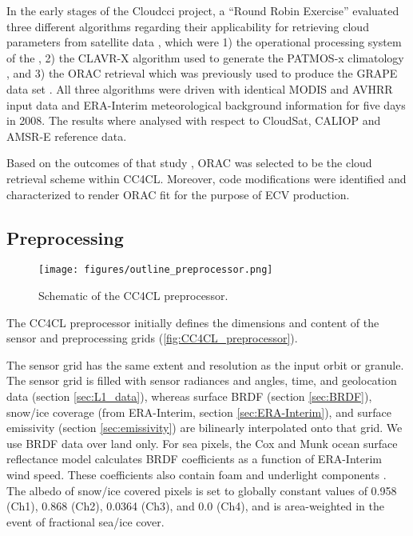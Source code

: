 In the early stages of the Cloud\textunderscore cci project, a ``Round Robin Exercise'' evaluated three different algorithms regarding their applicability for retrieving cloud parameters from satellite data \citep{Stengel15}, which were 1) the operational processing system of the \citet{CMSAF_web}, 2) the CLAVR-X algorithm used to generate the PATMOS-x climatology \citep{Heidinger13}, and 3) the ORAC retrieval which was previously used to produce the GRAPE data set \citep{Thomas09_GRAPE, GRAPE_web}. All three algorithms were driven with identical MODIS and AVHRR input data and ERA-Interim meteorological background information for five days in 2008. The results where analysed with respect to CloudSat, CALIOP and AMSR-E reference data. 

Based on the outcomes of that study \citep{Stengel15}, ORAC was selected to be the cloud retrieval scheme within CC4CL. Moreover, code modifications were identified and characterized to render ORAC fit for the purpose of ECV production. 

\subsection{Preprocessing}

\begin{figure}[h]
  \texttt{[image: figures/outline\_preprocessor.png]}
  \caption{Schematic of the CC4CL preprocessor.}
  \label{fig:CC4CL_preprocessor}
\end{figure}

The CC4CL preprocessor initially defines the dimensions and content of the sensor and preprocessing grids (\autoref{fig:CC4CL_preprocessor}). 

The sensor grid has the same extent and resolution as the input orbit or granule. The sensor grid is filled with sensor radiances and angles, time, and geolocation data (section \ref{sec:L1_data}), whereas surface BRDF (section \ref{sec:BRDF}), snow/ice coverage (from ERA-Interim, section \ref{sec:ERA-Interim}), and surface emissivity (section \ref{sec:emissivity}) are bilinearly interpolated onto that grid. We use BRDF data over land only. For sea pixels, the Cox and Munk ocean surface reflectance model calculates BRDF coefficients as a function of ERA-Interim wind speed. These coefficients also contain foam and underlight components \citep{Sayer10}. The albedo of snow/ice covered pixels is set to globally constant values of 0.958 (Ch1), 0.868 (Ch2), 0.0364 (Ch3), and 0.0 (Ch4), and is area-weighted in the event of fractional sea/ice cover.

